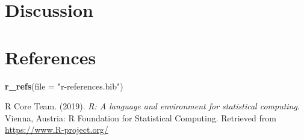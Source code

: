 \documentclass[man]{apa6}
\newenvironment{Shaded}{\begin{snugshade}}{\end{snugshade}}
\newcommand{\DataTypeTok}[1]{\textcolor[rgb]{0.13,0.29,0.53}{#1}}
\newcommand{\KeywordTok}[1]{\textcolor[rgb]{0.13,0.29,0.53}{\textbf{#1}}}
\newcommand{\NormalTok}[1]{#1}
\newcommand{\StringTok}[1]{\textcolor[rgb]{0.31,0.60,0.02}{#1}}
\begin{document}
\hypertarget{discussion}{%
\section{Discussion}\label{discussion}}

\newpage

\hypertarget{references}{%
\section{References}\label{references}}

\begin{Shaded}
\begin{Highlighting}[]
\KeywordTok{r_refs}\NormalTok{(}\DataTypeTok{file =} \StringTok{"r-references.bib"}\NormalTok{)}
\end{Highlighting}
\end{Shaded}

\begingroup
\setlength{\parindent}{-0.5in}
\setlength{\leftskip}{0.5in}

\hypertarget{refs}{}
\leavevmode\hypertarget{ref-R-base}{}%
R Core Team. (2019). \emph{R: A language and environment for statistical computing}. Vienna, Austria: R Foundation for Statistical Computing. Retrieved from \url{https://www.R-project.org/}

\endgroup
\end{document}

